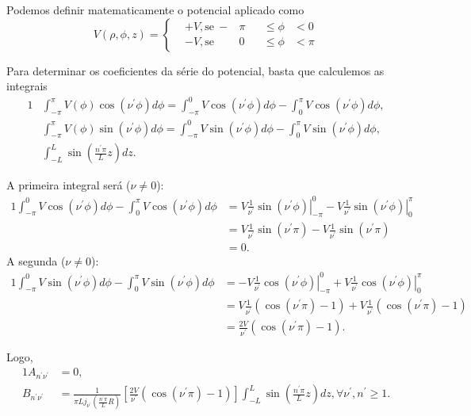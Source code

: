 \documentclass{article}
\newcommand{\eval}[3]{\left. #1 \right\rvert_{#2}^{#3}}
\begin{document}
Podemos definir matematicamente o potencial aplicado como
\begin{equation}
V(\rho,\phi,z) = \left\{
\begin{alignedat}{3}
 &+V, \mathrm{se\ } -&\pi& &\leq \phi& < 0\\
 &-V, \mathrm{se\ } &0& &\leq \phi& < \pi
\end{alignedat}
\right.
\end{equation}

Para determinar os coeficientes da série do potencial, basta que calculemos as integrais
\begin{alignat}{1}
 &\int_{-\pi}^{\pi} V(\phi) \cos{(\nu^{\prime}\phi)} d\phi =
 \int_{-\pi}^{0} V \cos{(\nu^{\prime}\phi)} d\phi - \int_{0}^{\pi} V \cos{(\nu^{\prime}\phi)} d\phi \mathrm{,}\\
 &\int_{-\pi}^{\pi} V(\phi) \sin{(\nu^{\prime}\phi)} d\phi =
 \int_{-\pi}^{0} V \sin{(\nu^{\prime}\phi)} d\phi - \int_{0}^{\pi} V \sin{(\nu^{\prime}\phi)} d\phi \mathrm{,}\\
 &\int_{-L}^{L} \sin{\left( \frac{n^{\prime} \pi}{L}z \right)} dz \mathrm{.}
\end{alignat}

A primeira integral será ($\nu \neq 0$):
\begin{alignat}{1}
\nonumber
 \int_{-\pi}^{0} V \cos{(\nu^{\prime}\phi)} d\phi - \int_{0}^{\pi} V \cos{(\nu^{\prime}\phi)} d\phi &=
 \eval{V \frac{1}{\nu^{\prime}} \sin{(\nu^{\prime}\phi)} }{-\pi}{0} -
 \eval{V \frac{1}{\nu^{\prime}} \sin{(\nu^{\prime}\phi)} }{0}{\pi} \\ \nonumber
 &= V \frac{1}{\nu^{\prime}} \sin{(\nu^{\prime}\pi)} - V \frac{1}{\nu^{\prime}} \sin{(\nu^{\prime}\pi)} \\
 &= 0\mathrm{.}
\end{alignat}
A segunda ($\nu \neq 0$):
\begin{alignat}{1}
\nonumber
 \int_{-\pi}^{0} V \sin{(\nu^{\prime}\phi)} d\phi - \int_{0}^{\pi} V \sin{(\nu^{\prime}\phi)} d\phi &=
 \eval{-V \frac{1}{\nu^{\prime}} \cos{(\nu^{\prime}\phi)} }{-\pi}{0} +
 \eval{V \frac{1}{\nu^{\prime}} \cos{(\nu^{\prime}\phi)} }{0}{\pi} \\ \nonumber
 &= V \frac{1}{\nu^{\prime}} (\cos{(\nu^{\prime}\pi)} - 1) + V \frac{1}{\nu^{\prime}} (\cos{(\nu^{\prime}\pi)} - 1)\\
 &= \frac{2V}{\nu^{\prime}} (\cos{(\nu^{\prime}\pi)} - 1) \mathrm{.}
\end{alignat}

Logo,
\begin{alignat}{1}
 A_{n^{\prime} \nu^{\prime}} &= 0\mathrm{,}\\
 B_{n^{\prime} \nu^{\prime}} &= \frac{1}{\pi L j_{\nu^{\prime}}\left( \frac{n^{\prime} \pi}{L} R \right)}
 \left[ \frac{2V}{\nu^{\prime}} (\cos{(\nu^{\prime}\pi)} - 1) \right]
 \int_{-L}^{L} \sin{\left( \frac{n^{\prime} \pi}{L}z \right)} dz, \forall \nu^{\prime}, n^{\prime} \geq 1 \mathrm{.}
\end{alignat}
\end{document}
